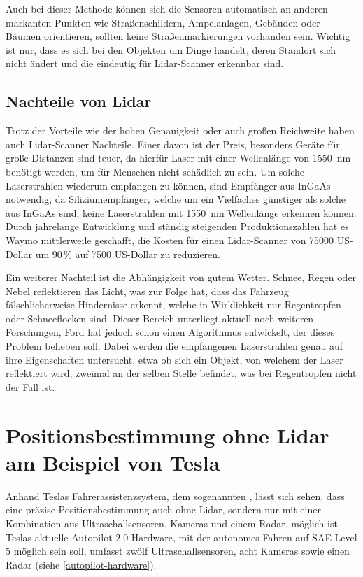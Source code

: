 Auch bei dieser Methode können sich die Sensoren automatisch an anderen markanten Punkten wie Straßenschildern, Ampelanlagen, Gebäuden oder Bäumen orientieren, sollten keine Straßenmarkierungen vorhanden sein. Wichtig ist nur, dass es sich bei den Objekten um Dinge handelt, deren Standort sich nicht ändert und die eindeutig für \acs{Lidar}-Scanner erkennbar sind.

\subsection{Nachteile von Lidar}

Trotz der Vorteile wie der hohen Genauigkeit oder auch großen Reichweite haben auch \acs{Lidar}-Scanner Nachteile. Einer davon ist der Preis, besonders Geräte für große Distanzen sind teuer, da hierfür Laser mit einer Wellenlänge von \SI{1550}{\nano\meter} benötigt werden, um für Menschen nicht schädlich zu sein. Um solche Laserstrahlen wiederum empfangen zu können, sind Empfänger aus \ac{InGaAs} notwendig, da Siliziumempfänger, welche um ein Vielfaches günstiger als solche aus \ac{InGaAs} sind, keine Laserstrahlen mit \SI{1550}{\nano\meter} Wellenlänge erkennen können.  Durch jahrelange Entwicklung und ständig steigenden Produktionszahlen hat es Waymo mittlerweile geschafft, die Kosten für einen \acs{Lidar}-Scanner von \num{75000} US-Dollar um 90\,\% auf \num{7500} US-Dollar zu reduzieren. 

Ein weiterer Nachteil ist die Abhängigkeit von gutem Wetter. Schnee, Regen oder Nebel reflektieren das Licht, was zur Folge hat, dass das Fahrzeug fälschlicherweise Hindernisse erkennt, welche in Wirklichkeit nur Regentropfen oder Schneeflocken sind. Dieser Bereich unterliegt aktuell noch weiteren Forschungen, Ford hat jedoch schon einen Algorithmus entwickelt, der dieses Problem beheben soll. Dabei werden die empfangenen Laserstrahlen genau auf ihre Eigenschaften untersucht, etwa ob sich ein Objekt, von welchem der Laser reflektiert wird, zweimal an der selben Stelle befindet, was bei Regentropfen nicht der Fall ist.


\section{Positionsbestimmung ohne Lidar am Beispiel von Tesla}\label{section-2-3}

Anhand Teslas Fahrerassistenzsystem, dem sogenannten , lässt sich sehen, dass eine präzise Positionsbestimmung auch ohne \acs{Lidar}, sondern nur mit einer Kombination aus Ultraschallsensoren, Kameras und einem \acs{Radar}, möglich ist. Teslas aktuelle Autopilot 2.0 Hardware, mit der autonomes Fahren auf \ac{SAE}-Level 5 möglich sein soll, umfasst zwölf Ultraschallsensoren, acht Kameras sowie einen \acs{Radar} (siehe \ref{autopilot-hardware}).

